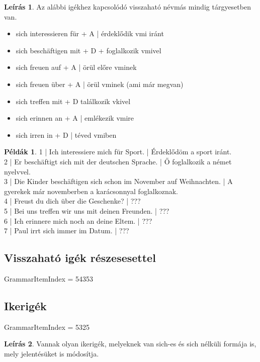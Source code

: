\documentclass{article}
\theoremstyle{definition}
\newtheorem*{exmp}{Példák}
\newtheorem*{desc}{Leírás}
\begin{document}
\begin{desc}
Az alábbi igékhez kapcsolódó visszaható névmás mindig tárgyesetben van.

\begin{itemize}
\item sich interessieren für + A | érdeklődik vmi iránt
\item sich beschäftigen mit + D + foglalkozik vmivel
\item sich freuen auf + A | örül előre vminek
\item sich freuen über + A | örül vminek (ami már megvan)
\item sich treffen mit + D  találkozik vkivel
\item sich erinnen an + A | emlékezik vmire
\item sich irren in + D | téved vmiben
\end{itemize}
\end{desc}

\begin{exmp}
1 | Ich interessiere mich für Sport. | Érdeklődöm a sport iránt.\\
2 | Er beschäftigt sich mit der deutschen Sprache. | Ő foglalkozik a német nyelvvel.\\
3 | Die Kinder beschäftigen sich schon im November auf Weihnachten. | A gyerekek már novemberben a karácsonnyal foglalkoznak.\\
4 | Freust du dich über die Geschenke? | ???\\
5 | Bei uns treffen wir uns mit deinen Freunden. | ???\\
6 | Ich erinnere mich noch an deine Eltem. | ???\\
7 | Paul irrt sich immer im Datum. | ???\\
\end{exmp}

\subsection{Visszaható igék részesesettel}

GrammarItemIndex = 54353

\subsection{Ikerigék}

GrammarItemIndex = 5325

\begin{desc}
Vannak olyan ikerigék, melyeknek van sich-es és sich nélküli
formája is, mely jelentésüket is módosítja.
\end{desc}
\end{document}
